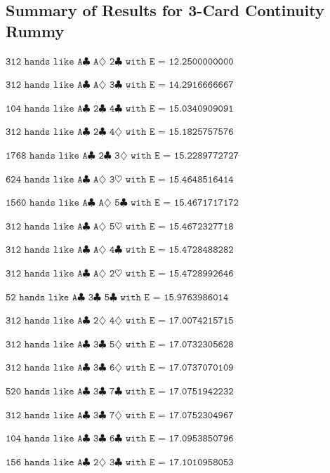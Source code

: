 \documentclass[letter,12pt]{article}
\begin{document}
{\setlength{\parindent}{0 cm}
\subsection{Summary of Results for 3-Card Continuity Rummy}

$\texttt{312 hands like A$\clubsuit$ A$\diamondsuit$ 2$\clubsuit$ with E = 12.2500000000}$

$\texttt{312 hands like A$\clubsuit$ A$\diamondsuit$ 3$\clubsuit$ with E = 14.2916666667}$

$\texttt{104 hands like A$\clubsuit$ 2$\clubsuit$ 4$\clubsuit$ with E = 15.0340909091}$

$\texttt{312 hands like A$\clubsuit$ 2$\clubsuit$ 4$\diamondsuit$ with E = 15.1825757576}$

$\texttt{1768 hands like A$\clubsuit$ 2$\clubsuit$ 3$\diamondsuit$ with E = 15.2289772727}$

$\texttt{624 hands like A$\clubsuit$ A$\diamondsuit$ 3$\heartsuit$ with E = 15.4648516414}$

$\texttt{1560 hands like A$\clubsuit$ A$\diamondsuit$ 5$\clubsuit$ with E = 15.4671717172}$

$\texttt{312 hands like A$\clubsuit$ A$\diamondsuit$ 5$\heartsuit$ with E = 15.4672327718}$

$\texttt{312 hands like A$\clubsuit$ A$\diamondsuit$ 4$\clubsuit$ with E = 15.4728488282}$

$\texttt{312 hands like A$\clubsuit$ A$\diamondsuit$ 2$\heartsuit$ with E = 15.4728992646}$

$\texttt{52 hands like A$\clubsuit$ 3$\clubsuit$ 5$\clubsuit$ with E = 15.9763986014}$

$\texttt{312 hands like A$\clubsuit$ 2$\diamondsuit$ 4$\diamondsuit$ with E = 17.0074215715}$

$\texttt{312 hands like A$\clubsuit$ 3$\clubsuit$ 5$\diamondsuit$ with E = 17.0732305628}$

$\texttt{312 hands like A$\clubsuit$ 3$\clubsuit$ 6$\diamondsuit$ with E = 17.0737070109}$

$\texttt{520 hands like A$\clubsuit$ 3$\clubsuit$ 7$\clubsuit$ with E = 17.0751942232}$

$\texttt{312 hands like A$\clubsuit$ 3$\clubsuit$ 7$\diamondsuit$ with E = 17.0752304967}$

$\texttt{104 hands like A$\clubsuit$ 3$\clubsuit$ 6$\clubsuit$ with E = 17.0953850796}$

$\texttt{156 hands like A$\clubsuit$ 2$\diamondsuit$ 3$\clubsuit$ with E = 17.1010958053}$

}
\end{document}
